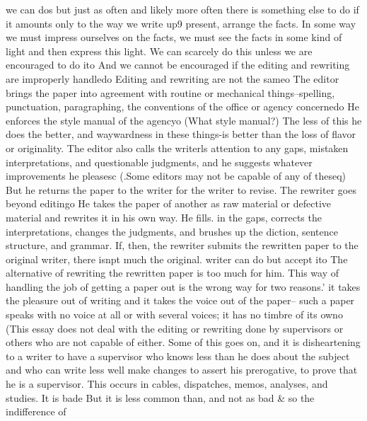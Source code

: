 \documentclass[
    oneside,
    11pt,
    draft
]{memoir}
\begin{document}
we can dos but just as often and likely more often there is something else to do if it amounts only to the way we write up9 present, arrange the facts. In some way we must impress ourselves on the facts, we must see the facts in some kind of light and then express this light. We can scarcely do this unless we are encouraged to do ito And we cannot be encouraged if the editing and rewriting are improperly handledo Editing and rewriting are not the sameo The editor brings the paper into agreement with routine or mechanical things--spelling, punctuation, paragraphing, the conventions of the office or agency concernedo He enforces the style manual of the agencyo (What style manual?) The less of this he does the better, and waywardness in these things-is better than the loss of flavor or originality. The editor also calls the writerls attention to any gaps, mistaken interpretations, and questionable judgments, and he suggests whatever improvements he pleasesc (.Some editors may not be capable of any of theseq) But he returns the paper to the writer for the writer to revise. The rewriter goes beyond editingo He takes the paper of another as raw material or defective material and rewrites it in his own way. He fills. in the gaps, corrects the interpretations, changes the judgments, and brushes up the diction, sentence structure, and grammar. If, then, the rewriter submits the rewritten paper to the original writer, there isnpt much the original. writer can do but accept ito The alternative of rewriting the rewritten paper is too much for him. This way of handling the job of getting a paper out is the wrong way for two reasons.' it takes the pleasure out of writing and it takes the voice out of the paper-- such a paper speaks with no voice at all or with several voices; it has no timbre of its owno (This essay does not deal with the editing or rewriting done by supervisors or others who are not capable of either. Some of this goes on, and it is disheartening to a writer to have a supervisor who knows less than he does about the subject and who can write less well make changes to assert his prerogative, to prove that he is a supervisor. This occurs in cables, dispatches, memos, analyses, and studies. It is bade But it is less common than, and not as bad \& so the indifference of
\end{document}
